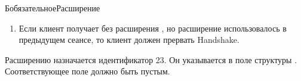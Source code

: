 \begin{appendix}{Б}{обязательное}{Расширение }
\begin{enumerate}
\item
Если клиент получает  без расширения
, но расширение использовалось в предыдущем 
сеансе, то клиент должен прервать Handshake.
\end{enumerate}

\label{EMS.Id}

Расширению  назначается идентификатор 23. 
Он указывается в поле  структуры . 
Соответствующее поле  должно быть пустым.

\end{appendix}
